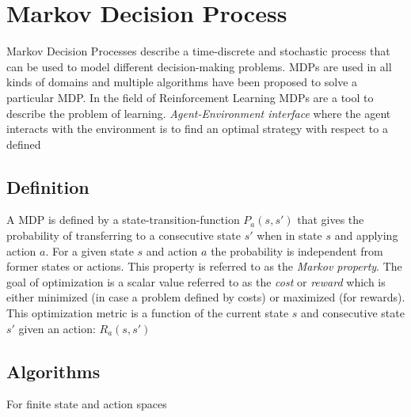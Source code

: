 \chapter{Markov Decision Process}

Markov Decision Processes describe a time-discrete and stochastic process that can be used to model different decision-making problems. MDPs are used in all kinds of domains and multiple algorithms have been proposed to solve a particular MDP. In the field of Reinforcement Learning MDPs are a tool \cite{Sutton2018} to describe the problem of learning. \emph{Agent-Environment interface} where the agent interacts with the environment  is to find an optimal strategy with respect to a defined 

\section{Definition}

A MDP is defined by a state-transition-function $P_a(s,s')$ that gives the probability of transferring to a consecutive state $s'$ when in state $s$ and applying action $a$. For a given state $s$ and action $a$ the probability is independent from former states or actions. This property is referred to as the \emph{Markov property}. The goal of optimization is a scalar value referred to as the \emph{cost} or \emph{reward} which is either minimized (in case a problem defined by costs) or maximized (for rewards). This optimization metric is a function of the current state $s$ and consecutive state $s'$ given an action: $R_a(s,s')$

\section{Algorithms}

For finite state and action spaces 